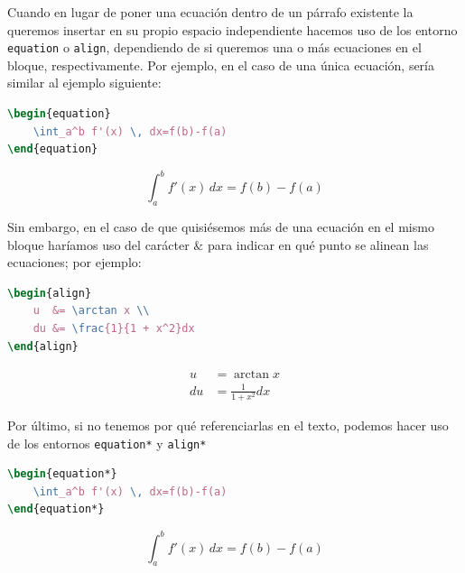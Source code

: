 Cuando en lugar de poner una ecuación dentro de un párrafo existente la queremos insertar en su propio espacio independiente hacemos uso de los entorno \texttt{equation} o \texttt{align}, dependiendo de si queremos una o más ecuaciones en el bloque, respectivamente. Por ejemplo, en el caso de una única ecuación, sería similar al ejemplo siguiente:

\begin{minipage}[c]{.5\textwidth}
\begin{lstlisting}[language=tex]
\begin{equation}
	\int_a^b f'(x) \, dx=f(b)-f(a)
\end{equation}
\end{lstlisting}
\end{minipage}%
\begin{minipage}[c]{.5\textwidth}
\begin{equation}
    \int_a^b f'(x) \, dx=f(b)-f(a)
\end{equation}
\end{minipage}

Sin embargo, en el caso de que quisiésemos más de una ecuación en el mismo bloque haríamos uso del carácter \& para indicar en qué punto se alinean las ecuaciones; por ejemplo:

\begin{minipage}[t]{.5\textwidth}
\begin{lstlisting}[language=tex]
\begin{align}
    u  &= \arctan x \\ 
    du &= \frac{1}{1 + x^2}dx
\end{align}
\end{lstlisting}
\end{minipage}%
\begin{minipage}{.5\textwidth}
\begin{align}
    u  &= \arctan x \\ 
    du &= \frac{1}{1 + x^2}dx
\end{align}
\end{minipage}

Por último, si no tenemos por qué referenciarlas en el texto, podemos hacer uso de los entornos \texttt{equation*} y \texttt{align*}

\begin{minipage}[c]{.5\textwidth}
\begin{lstlisting}[language=tex]
\begin{equation*}
	\int_a^b f'(x) \, dx=f(b)-f(a)
\end{equation*}
\end{lstlisting}
\end{minipage}%
\begin{minipage}[c]{.5\textwidth}
\begin{equation*}
	\int_a^b f'(x) \, dx=f(b)-f(a)
\end{equation*}
\end{minipage}

